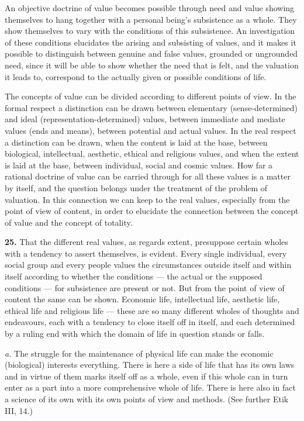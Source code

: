 \documentclass[12pt]{book}
\newcommand{\hnum}[1]{\textbf{#1.}\enspace}
\newcommand{\opage}[1]{\marginnote{\footnotesize\textit{[#1]}}}
\begin{document}
\opage{68}An objective doctrine of value becomes possible through need and value showing
themselves to hang together with a personal being's subsistence as a whole. They show
themselves to vary with the conditions of this subsistence. An investigation of these
conditions elucidates the arising and subsisting of values, and it makes it possible
to distinguish between genuine and false values, grounded or ungrounded need, since it
will be able to show whether the need that is felt, and the valuation it leads to,
correspond to the actually given or possible conditions of life.

The concepts of value can be divided according to different points of view. In the
formal respect a distinction can be drawn between elementary (sense-determined) and
ideal (representation-determined) values, between immediate and mediate values (ends
and means), between potential and actual values. In the real respect a distinction can
be drawn, when the content is laid at the base, between biological, intellectual,
aesthetic, ethical and religious values, and when the extent is laid at the base,
between individual, social and cosmic values. How far a rational doctrine of value can
be carried through for all these values is a matter by itself, and the question
belongs under the treatment of the problem of valuation. In this connection we can
keep to the real values, especially from the point of view of content, in order to
elucidate the connection between the concept of value and the concept of totality.

\hnum{25} That the different real values, as regards extent, presuppose certain wholes
with a tendency to assert themselves, is evident. Every single individual, every
social group and every people values the circumstances outside itself and within
itself according to whether the conditions --- the actual or the supposed conditions
--- for subsistence are present or not. But from the point of view of content the same
can be shown. Economic life, intellectual life, aesthetic life, ethical life and
religious life --- these are so many different wholes of thoughts and endeavours, each
with a tendency to close itself off in itself, and each determined by a ruling end with
which the domain of life in question stands or falls.

\textit{a.} The struggle for the maintenance of physical life can make the economic
(biological) interests everything. There is here a side of life that has its own laws
and in virtue of them marks itself off as a whole, even if this whole can in turn enter
as a part into a more comprehensive whole of life. There is here also in fact a science
of its own with its own points of view and methods. (See further Etik III, 14.)
\end{document}
